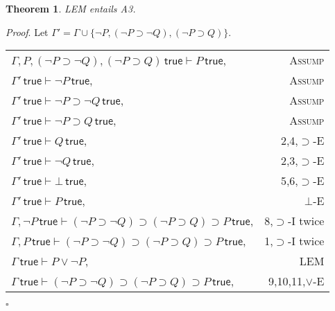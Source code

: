 \documentclass{article}
\newcounter{rowcount}
\newtheorem{theorem}{Theorem}[section]
\newenvironment{proof}{\emph{Proof}.}{\hfill$\square$}
\newcommand{\true}{\,\textsf{true}}
\begin{document}
\begin{theorem}
    \emph{LEM} entails \emph{A3}.
\end{theorem}
\setcounter{rowcount}{0}
\begin{proof}
    Let $\Gamma' = \Gamma \cup\{\neg P, (\neg P \supset \neg Q), (\neg P \supset Q)\}$.

    \begin{tabular}{@{\stepcounter{rowcount}\therowcount. }lr}
        $\Gamma, P, (\neg P \supset \neg Q), (\neg P \supset Q)\true \vdash P \true $,                & \textsc{Assump}     \\
        $\Gamma'\true \vdash \neg P\true$,                                                            & \textsc{Assump}     \\
        $\Gamma'\true \vdash \neg P \supset \neg Q\true$,                                             & \textsc{Assump}     \\
        $\Gamma'\true \vdash \neg P \supset Q\true$,                                                  & \textsc{Assump}     \\
        $\Gamma'\true \vdash Q\true$,                                                                 & 2,4,$\supset$-E     \\
        $\Gamma'\true \vdash \neg Q\true$,                                                            & 2,3,$\supset$-E     \\
        $\Gamma'\true \vdash \bot\true$,                                                              & 5,6,$\supset$-E     \\
        $\Gamma'\true \vdash P\true$,                                                                 & $\bot$-E            \\
        $\Gamma, \neg P\true \vdash (\neg P \supset \neg Q)\supset (\neg P \supset Q)\supset P\true$, & 8,$\supset$-I twice \\
        $\Gamma, P\true \vdash (\neg P \supset \neg Q)\supset (\neg P \supset Q)\supset P\true$,      & 1,$\supset$-I twice \\
        $\Gamma \true \vdash P\lor \neg P$,                                                           & LEM                 \\
        $\Gamma \true \vdash (\neg P \supset \neg Q)\supset (\neg P \supset Q)\supset P\true$,        & 9,10,11,$\lor$-E    \\
    \end{tabular}
\end{proof}
\end{document}
